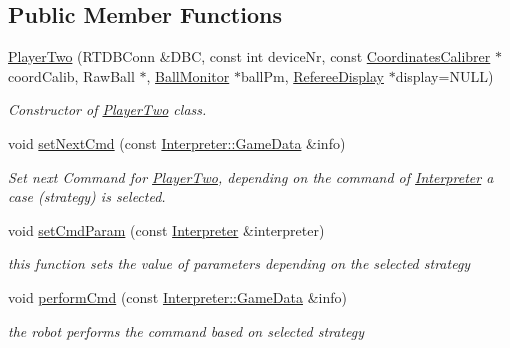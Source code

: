\subsection*{Public Member Functions}
\begin{DoxyCompactItemize}
\item 
\hyperlink{classPlayerTwo_ac69719e70c78f7dffa36300f833955b1}{PlayerTwo} (RTDBConn \&DBC, const int deviceNr, const \hyperlink{classCoordinatesCalibrer}{CoordinatesCalibrer} $\ast$coordCalib, RawBall $\ast$, \hyperlink{classBallMonitor}{BallMonitor} $\ast$ballPm, \hyperlink{classRefereeDisplay}{RefereeDisplay} $\ast$display=NULL)
\begin{DoxyCompactList}\small\item\em Constructor of \hyperlink{classPlayerTwo}{PlayerTwo} class. \item\end{DoxyCompactList}\item 
void \hyperlink{classPlayerTwo_a7ac9a9a4f1dedee2006e6a0c79f37c0c}{setNextCmd} (const \hyperlink{structInterpreter_1_1GameData}{Interpreter::GameData} \&info)
\begin{DoxyCompactList}\small\item\em Set next Command for \hyperlink{classPlayerTwo}{PlayerTwo}, depending on the command of \hyperlink{classInterpreter}{Interpreter} a case (strategy) is selected. \item\end{DoxyCompactList}\item 
void \hyperlink{classPlayerTwo_aa0294cf24297f66ffd92f1a250794340}{setCmdParam} (const \hyperlink{classInterpreter}{Interpreter} \&interpreter)
\begin{DoxyCompactList}\small\item\em this function sets the value of parameters depending on the selected strategy \item\end{DoxyCompactList}\item 
void \hyperlink{classPlayerTwo_a56d794b718c60092a324f312b8333eb9}{performCmd} (const \hyperlink{structInterpreter_1_1GameData}{Interpreter::GameData} \&info)
\begin{DoxyCompactList}\small\item\em the robot performs the command based on selected strategy \item\end{DoxyCompactList}\end{DoxyCompactItemize}
